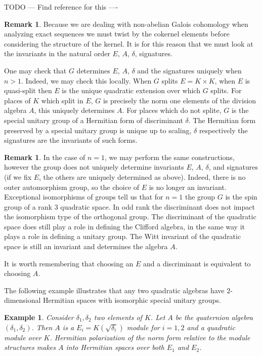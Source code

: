 \documentclass{article}
\theoremstyle{plain}
\newtheorem{example}[theorem]{Example}
\theoremstyle{definition}
\newtheorem{remark}[theorem]{Remark}
\begin{document}
\begin{itemize}
TODO --- Find reference for this ----

\begin{remark}
Because we are dealing with non-abelian Galois cohomology when analyzing exact sequences we must twist by the cokernel elements before considering the structure of the kernel. It is for this reason that we must look at the invariants in the natural order $E$, $A$, $\delta$, signatures.
\end{remark}

One may check that $G$ determines $E$, $A$, $\delta$ and the signatures uniquely when $n>1$. Indeed, we may check this locally.
When $G$ splits $E=K\times K$, when $E$ is quasi-split then $E$ is the unique quadratic extension over which $G$ splits.
For places of $K$ which split in $E$, $G$ is precisely the norm one elements of the division algebra $A$, this uniquely determines $A$.
For places which do not splite, $G$ is the special unitary group of a Hermitian form of discriminant $\delta$.
The Hermitian form preserved by a special unitary group is unique up to scaling, $\delta$ respectively the signatures are the invariants of such forms.

\begin{remark}
In the case of $n=1$, we may perform the same constructions, however the group does not uniquely determine invariants $E$, $A$, $\delta$, and signatures (if we fix $E$, the others are uniquely determined as above).
Indeed, there is no outer automorphism group, so the choice of $E$ is no longer an invariant.
Exceptional isomorphisms of groups tell us that for $n=1$ the group $G$ is the spin group of a rank $3$ quadratic space.
In odd rank the discriminant does not impact the isomorphism type of the orthogonal group.
The discriminant of the quadratic space does still play a role in defining the Clifford algebra, in the same way it plays a role in defining a unitary group. The Witt invariant of the quadratic space is still an invariant and determines the algebra $A$.

It is worth remembering that choosing an $E$ and a discriminant is equivalent to choosing $A$.

The following example illustrates that any two quadratic algebras have $2$-dimensional Hermitian spaces with isomorphic special unitary groups.
\begin{example}
Consider $\delta_1,\delta_2$ two elements of $K$.
Let $A$ be the quaternion algebra $(\delta_1,\delta_2)$.
Then $A$ is a $E_i=K(\sqrt{\delta_i})$ module for $i=1,2$ and a quadratic module over $K$.
Hermitian  polarization of the norm form relative to the module structures makes $A$ into Hermitian spaces over both $E_1$ and $E_2$.


\end{example}
\end{remark}
\end{itemize}
\end{document}
